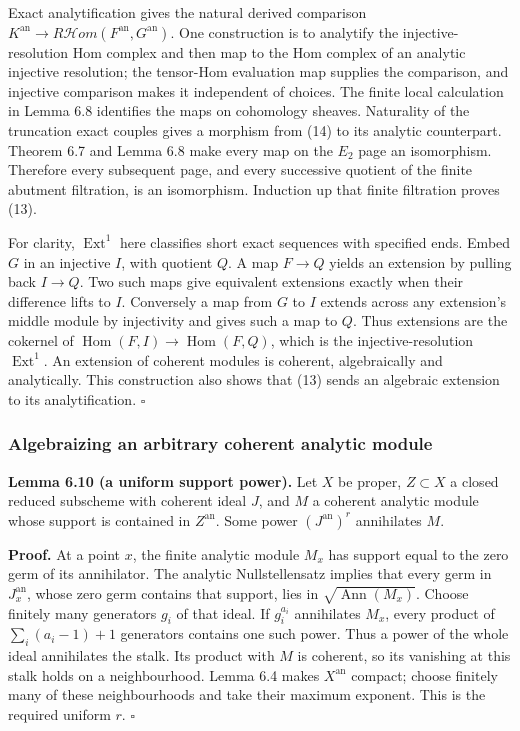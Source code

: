 \documentclass[11pt]{article}
\begin{document}
Exact analytification gives the natural derived comparison
\(K^{\mathrm{an}}\to R\mathcal Hom(F^{\mathrm{an}},G^{\mathrm{an}})\).
One construction is to analytify the injective-resolution Hom complex
and then map to the Hom complex of an analytic injective resolution; the
tensor-Hom evaluation map supplies the comparison, and injective
comparison makes it independent of choices. The finite local calculation
in Lemma 6.8 identifies the maps on cohomology sheaves. Naturality of
the truncation exact couples gives a morphism from (14) to its analytic
counterpart. Theorem 6.7 and Lemma 6.8 make every map on the \(E_2\)
page an isomorphism. Therefore every subsequent page, and every
successive quotient of the finite abutment filtration, is an
isomorphism. Induction up that finite filtration proves (13).

For clarity, \(\operatorname{Ext}^1\) here classifies short exact
sequences with specified ends. Embed \(G\) in an injective \(I\), with
quotient \(Q\). A map \(F\to Q\) yields an extension by pulling back
\(I\to Q\). Two such maps give equivalent extensions exactly when their
difference lifts to \(I\). Conversely a map from \(G\) to \(I\) extends
across any extension's middle module by injectivity and gives such a map
to \(Q\). Thus extensions are the cokernel of
\(\operatorname{Hom}(F,I)\to\operatorname{Hom}(F,Q)\), which is the
injective-resolution \(\operatorname{Ext}^1\). An extension of coherent
modules is coherent, algebraically and analytically. This construction
also shows that (13) sends an algebraic extension to its
analytification. \(\square\)

\subsubsection{Algebraizing an arbitrary coherent analytic
module}\label{algebraizing-an-arbitrary-coherent-analytic-module}

\textbf{Lemma 6.10 (a uniform support power).} Let \(X\) be proper,
\(Z\subset X\) a closed reduced subscheme with coherent ideal \(J\), and
\(M\) a coherent analytic module whose support is contained in
\(Z^{\mathrm{an}}\). Some power \((J^{\mathrm{an}})^r\) annihilates
\(M\).

\textbf{Proof.} At a point \(x\), the finite analytic module \(M_x\) has
support equal to the zero germ of its annihilator. The analytic
Nullstellensatz implies that every germ in \(J^{\mathrm{an}}_x\), whose
zero germ contains that support, lies in
\(\sqrt{\operatorname{Ann}(M_x)}\). Choose finitely many generators
\(g_i\) of that ideal. If \(g_i^{a_i}\) annihilates \(M_x\), every
product of \(\sum_i(a_i-1)+1\) generators contains one such power. Thus
a power of the whole ideal annihilates the stalk. Its product with \(M\)
is coherent, so its vanishing at this stalk holds on a neighbourhood.
Lemma 6.4 makes \(X^{\mathrm{an}}\) compact; choose finitely many of
these neighbourhoods and take their maximum exponent. This is the
required uniform \(r\). \(\square\)
\end{document}
